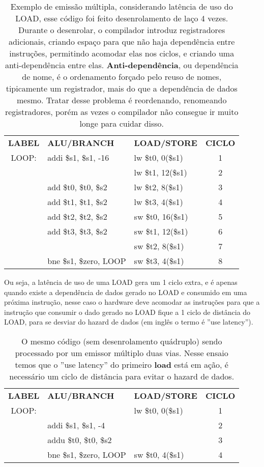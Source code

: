 \documentclass{article}
\begin{document}
\begin{enumerate}
\begin{table}[ht!]
\centering
\begin{tabular}{cllc}
\textbf{LABEL}&\textbf{ALU/BRANCH} & \textbf{LOAD/STORE}&\textbf{CICLO}\\
LOOP: & addi \$s1, \$s1, -16 & lw \$t0, 0(\$s1) & 1\\
& & lw \$t1, 12(\$s1) & 2 \\
& add \$t0, \$t0, \$s2 & lw \$t2, 8(\$s1) & 3 \\
& add \$t1, \$t1, \$s2 & lw \$t3, 4(\$s1) & 4 \\
& add \$t2, \$t2, \$s2 & sw \$t0, 16(\$s1) & 5 \\
& add \$t3, \$t3, \$s2 & sw \$t1, 12(\$s1) & 6 \\
& & sw \$t2, 8(\$s1) & 7 \\
& bne \$s1, \$zero, LOOP & sw \$t3, 4(\$s1) & 8 \\
\end{tabular}
\caption{Exemplo de emissão múltipla, considerando latência de uso do LOAD, 
esse código foi feito desenrolamento de laço 4 vezes. Durante o desenrolar, o 
compilador introduz registradores adicionais, criando espaço para que não haja 
dependência entre instruções, permitindo acomodar elas nos ciclos, e criando 
uma anti-dependência entre elas. \textbf{Anti-dependência}, ou dependência de 
nome, é o ordenamento forçado pelo reuso de nomes, tipicamente um registrador, 
mais do que a dependência de dados mesmo. Tratar desse problema é reordenando, 
renomeando registradores, porém as vezes o compilador não consegue ir muito 
longe para cuidar disso.}
\end{table}

Ou seja, a latência de uso de uma LOAD gera um 1 ciclo extra, e é apenas quando 
existe a dependência de dados gerado no LOAD e consumido em uma próxima 
instrução, nesse caso o hardware deve acomodar as instruções para que a 
instrução que consumir o dado gerado no LOAD fique a 1 ciclo de distância do 
LOAD, para se desviar do hazard de dados (em inglês o termo é ''use latency'').

\begin{table}[ht!]
  \centering
  \begin{tabular}{cllc}
    \textbf{LABEL} & \textbf{ALU/BRANCH} & \textbf{LOAD/STORE} & 
    \textbf{CICLO} \\
    LOOP: &  & lw \$t0, 0(\$s1) & 1 \\
    & addi \$s1, \$s1, -4 &  & 2 \\
    & addu \$t0, \$t0, \$s2 &  & 3 \\
    & bne \$s1, \$zero, LOOP & sw \$t0, 4(\$s1) & 4 \\
  \end{tabular}
  \caption{O mesmo código (sem desenrolamento quádruplo) sendo processado por um
  emissor múltiplo duas vias. Nesse ensaio temos que o ''use latency'' do
  primeiro \textbf{load} está em ação, é necessário um ciclo de distância para
  evitar o hazard de dados.}
\end{table}


\end{enumerate}
\end{document}
